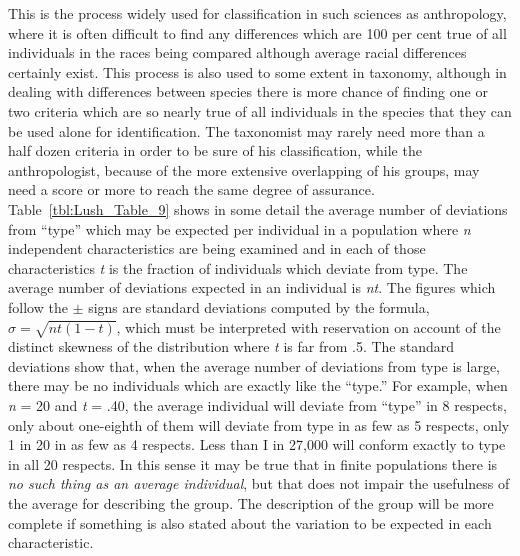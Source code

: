 This is the process widely used for classification in such sciences as
anthropology, where it is often difficult to find any differences which
are 100 per cent true of all individuals in the races being compared
although average racial differences certainly exist. This process is also
used to some extent in taxonomy, although in dealing with differences
between species there is more chance of finding one or two criteria
which are so nearly true of all individuals in the species that they can
be used alone for identification. The taxonomist may rarely need more
than a half dozen criteria in order to be sure of his classification, while
the anthropologist, because of the more extensive overlapping of his
groups, may need a score or more to reach the same degree of assurance.
Table~\ref{tbl:Lush_Table_9} shows in some detail the average number of
 deviations from
``type'' which may be expected per individual in a population where
\textit{n} independent characteristics are being examined and in each of those
characteristics \textit{t} is the fraction of individuals which deviate from type.
The average number of deviations expected in an individual is \textit{nt}. The
figures which follow the $\pm$ signs are standard deviations computed by
the formula, $\sigma = \sqrt{nt(1 - t)}$, which must be interpreted with
reservation on account of the distinct skewness of the distribution where \textit{t} is
far from .5. The standard deviations show that, when the average number
of deviations from type is large, there may be no individuals which
are exactly like the ``type.'' For example, when \textit{n} = 20 and \textit{t} = .40, the
average individual will deviate from ``type'' in 8 respects, only about
one-eighth of them will deviate from type in as few as 5 respects, only 1
in 20 in as few as 4 respects. Less than I in 27,000 will conform exactly
to type in all 20 respects. In this sense it may be true that in finite populations
there is \textit{no such thing as an average individual}, but that does not
impair the usefulness of the average for describing the group. The
description of the group will be more complete if something is also
stated about the variation to be expected in each characteristic.

